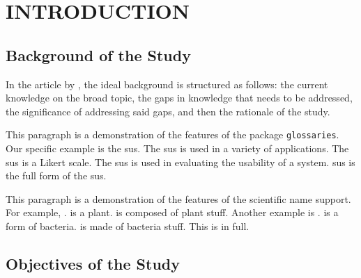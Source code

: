 \documentclass{strrespaper-trad}
\begin{document}
	\contents
	\listoflistings

	\mainmatter

	\chapter{INTRODUCTION}
		\section{Background of the Study}

			In the article  by \citeauthor{sachdevHowWriteBackground2018}, the ideal background is structured as follows: the current knowledge on the broad topic, the gaps in knowledge that needs to be addressed, the significance of addressing said gaps, and then the rationale of the study.

			This paragraph is a demonstration of the features of the package \texttt{glossaries}.
			Our specific example is the \acs{sus}.
			The \ac{sus} is used in a variety of applications.
			The \ac{sus} is a Likert scale.
			The \acl{sus} is used in evaluating the usability of a system.
			\Acf{sus} is the full form of the \ac{sus}.

			This paragraph is a demonstration of the features of the scientific name support. 
			For example, \At.
			\At is a plant.
			\At is composed of plant stuff.
			Another example is \ecoli.
			\ecoli is a form of bacteria.
			\ecolishort is made of bacteria stuff.
			This is \ecolilong in full.

			\Blindtext[2]

		\section{Objectives of the Study}
			\nocite{theopenuniversityHealthManagementEthics2017}
\end{document}
